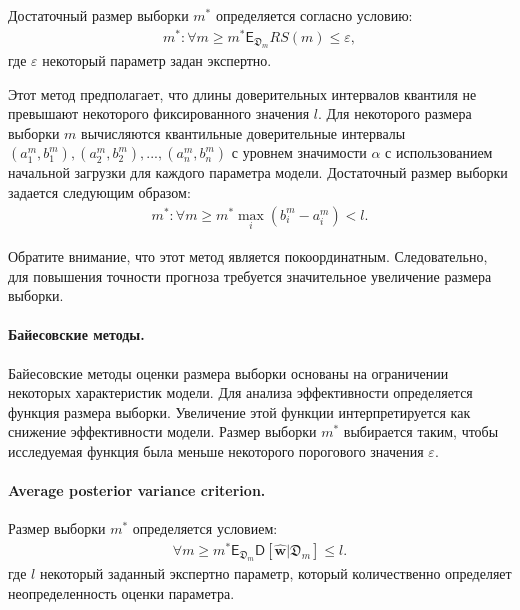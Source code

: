Достаточный размер выборки $m^*$ определяется согласно условию:
\[
\label{eq:hb:7}
\begin{aligned}
	m^*: \forall m \geq m^* \mathsf{E}_{\mathfrak{D}_{m}}RS(m) \leq \varepsilon,
\end{aligned}
\]
где $\varepsilon$ некоторый параметр задан экспертно.

Этот метод предполагает, что длины доверительных интервалов квантиля не превышают некоторого фиксированного значения $l$. Для некоторого размера выборки $m$ вычисляются квантильные доверительные интервалы $\left (a^m_1, b^m_1\right), \left(a^m_2, b^m_2 \right), ..., \left(a^m_n, b^m_n \right)$ с уровнем значимости $\alpha$ с использованием начальной загрузки для каждого параметра модели. Достаточный размер выборки задается следующим образом:
\[
\label{eq:hb:8}
\begin{aligned}
	m^*: \forall m\geq m^* \max_i\left(b^m_i - a^m_i\right) < l.
\end{aligned}
\]
    
Обратите внимание, что этот метод является покоординатным. Следовательно, для повышения точности прогноза требуется значительное увеличение размера выборки.
    
\paragraph{Байесовские методы.}
Байесовские методы оценки размера выборки основаны на ограничении некоторых характеристик модели. Для анализа эффективности определяется функция размера выборки. Увеличение этой функции интерпретируется как снижение эффективности модели. Размер выборки $m^*$ выбирается таким, чтобы исследуемая функция была меньше некоторого порогового значения $\varepsilon$.

\paragraph{Average posterior variance criterion.}
Размер выборки $m^*$ определяется условием:
\[
\label{eq:bs:1}
\begin{aligned}
	\forall m \geq m^*    \mathsf{E}_{\mathfrak{D}_m}\mathsf{D}\left[\hat{\textbf{w}}|\mathfrak{D}_m\right] \leq l.
\end{aligned}
\]
где $l$ некоторый заданный экспертно параметр, который количественно определяет неопределенность оценки параметра.

